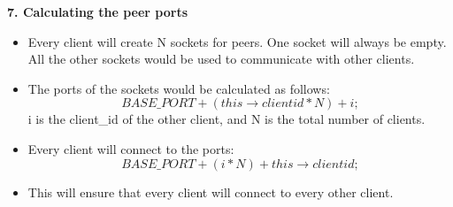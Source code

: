 \documentclass[12pt]{scrartcl}
\begin{document}
\textbf{7. Calculating the peer ports}

\begin{itemize}
    \item Every client will create N sockets for peers. One socket will always be empty. All the other sockets would be used to communicate with other clients.
    \item The ports of the sockets would be calculated as follows: $$BASE\_PORT + (this\rightarrow clientid * N) + i;$$
    i is the client\_id of the other client, and N is the total number of clients.
    \item Every client will connect to the ports:  $$BASE\_PORT + (i * N) + this\rightarrow clientid;$$
    \item This will ensure that every client will connect to every other client.
\end{itemize}
\end{document}
